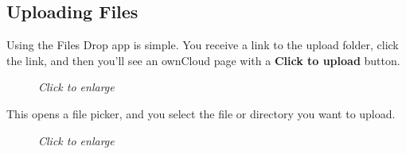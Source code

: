 \documentclass[letterpaper,10pt,english]{sphinxmanual}
\begin{document}
\subsection{Uploading Files}
\label{files/file_drop:uploading-files}
Using the Files Drop app is simple. You receive a link to the upload
folder, click the link, and then you'll see an ownCloud page with a \textbf{Click to
upload} button.
\begin{figure}[htbp]
\centering
\capstart

\caption{\emph{Click to enlarge}}\end{figure}

This opens a file picker, and you select the file or directory you want to
upload.
\begin{figure}[htbp]
\centering
\capstart

\caption{\emph{Click to enlarge}}\end{figure}
\end{document}
